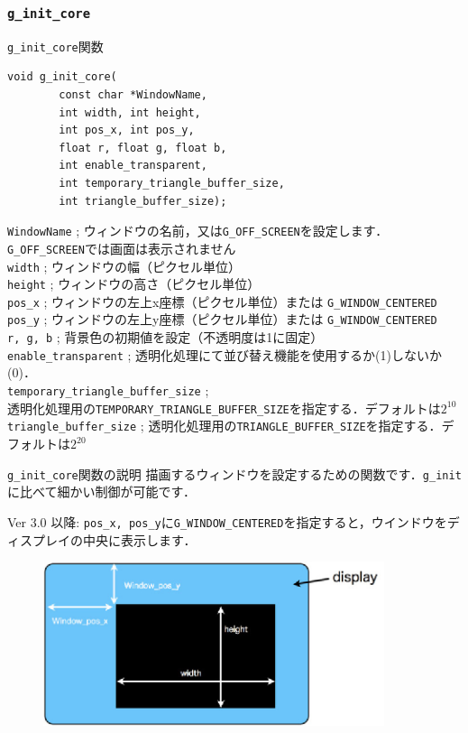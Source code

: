 \documentclass[platex,a4paper,12pt]{jsarticle}%
\begin{document}
\subsubsection{\texttt{g\_init\_core}}

\begin{itembox}[l]{\texttt{g\_init\_core}関数}
\begin{verbatim}
void g_init_core(
        const char *WindowName,
        int width, int height,
        int pos_x, int pos_y,
        float r, float g, float b,
        int enable_transparent,
        int temporary_triangle_buffer_size, 
        int triangle_buffer_size);
\end{verbatim}
\verb|WindowName| ; ウィンドウの名前，又は\verb|G_OFF_SCREEN|を設定します．\verb|G_OFF_SCREEN|では画面は表示されません\\
\verb|width| ; ウィンドウの幅（ピクセル単位）\\
\verb|height| ; ウィンドウの高さ（ピクセル単位）\\
\verb|pos_x| ; ウィンドウの左上x座標（ピクセル単位）または \verb|G_WINDOW_CENTERED|\\
\verb|pos_y| ; ウィンドウの左上y座標（ピクセル単位）または \verb|G_WINDOW_CENTERED|\\
\verb|r, g, b| ; 背景色の初期値を設定（不透明度は1に固定）\\
\verb|enable_transparent| ; 透明化処理にて並び替え機能を使用するか(1)しないか(0)．\\
\verb|temporary_triangle_buffer_size| ;\\ 透明化処理用の\verb|TEMPORARY_TRIANGLE_BUFFER_SIZE|を指定する．デフォルトは$2^{10}$\\
\verb|triangle_buffer_size| ; 透明化処理用の\verb|TRIANGLE_BUFFER_SIZE|を指定する．デフォルトは$2^{20}$
\end{itembox}

\begin{itembox}[l]{\texttt{g\_init\_core}関数の説明}
描画するウィンドウを設定するための関数です．\texttt{g\_init}に比べて細かい制御が可能です．

Ver 3.0 以降: \verb|pos_x, pos_y|に\verb|G_WINDOW_CENTERED|を指定すると，ウインドウをディスプレイの中央に表示します．
\end{itembox}

\begin{figure}[htb]
\centering
\includegraphics[width=100mm]{Canvas_g_init_core.eps}
\end{figure}
\end{document}
